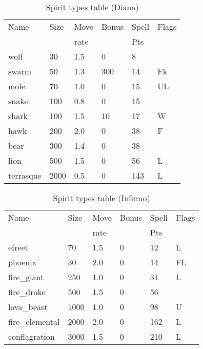 \begin{same}
\begin{table}[hbpt]
\caption{Spirit types table (Diana)}
\begin{tabular}{ || l | l | l | l | l | l || }
\hline
Name            & Size &Move&Bonus&Spell&Flags\\
                &      &rate&     &Pts  &\\
\hline
wolf            &   30 & 1.5&   0 &   8 &\\
swarm           &   50 & 1.3& 300 &  14 &Fk\\
mole            &   70 & 1.0&   0 &  15 &UL\\
snake           &  100 & 0.8&   0 &  15 &\\
shark           &  100 & 1.5&  10 &  17 &W\\
hawk            &  200 & 2.0&   0 &  38 &F\\
bear            &  300 & 1.4&   0 &  38 &\\
lion            &  500 & 1.5&   0 &  56 &L\\
terrasque       & 2000 & 0.5&   0 &  143 &L\\
\hline
\end{tabular}
\end{table}
\end{same}
\begin{same}
\begin{table}[hbpt]
\caption{Spirit types table (Inferno)}
\begin{tabular}{ || l | l | l | l | l | l || }
\hline
Name            & Size &Move&Bonus&Spell&Flags\\
                &      &rate&     &Pts  &\\
\hline
efreet          &   70 & 1.5&   0 &  12 &L\\
phoenix         &   30 & 2.0&   0 &  14 &FL\\
fire_giant      &  250 & 1.0&   0 &  31 &L\\
fire_drake      &  500 & 1.5&   0 &  56 &\\
lava_beast      & 1000 & 1.0&   0 &  98 &U\\
fire_elemental  & 2000 & 2.0&   0 &  162 &L\\
conflagration   & 3000 & 1.5&   0 &  210 &L\\
\hline
\end{tabular}
\end{table}
\end{same}
